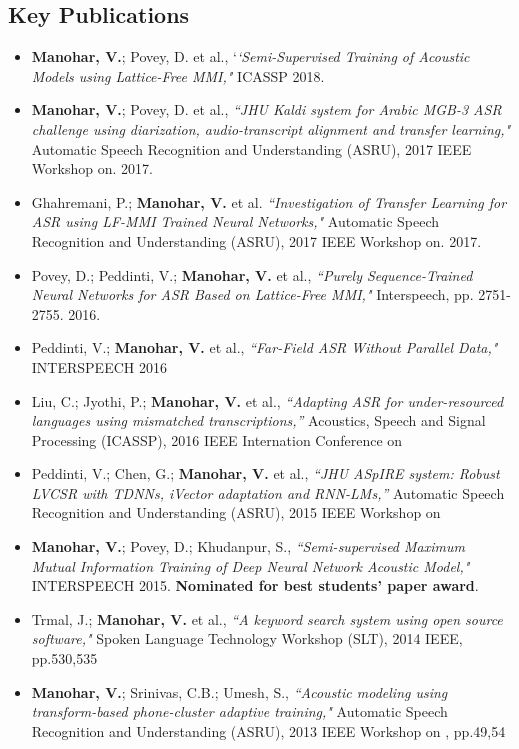 \documentclass[margin,line,pifont,palatino,courier]{res}
\begin{document}
\begin{resume}
\vspace{-2pt}

\section{\sc Key Publications}
\begin{itemize}
  \item 
  \textbf{Manohar, V.}; Povey, D. et al., `\textit{`Semi-Supervised Training of Acoustic Models using Lattice-Free MMI,"} ICASSP 2018.
  \item
    \textbf{Manohar, V.}; Povey, D. et al., \textit{``JHU Kaldi system for Arabic MGB-3 ASR challenge using diarization, audio-transcript alignment and transfer learning,"} Automatic Speech Recognition and Understanding (ASRU), 2017 IEEE Workshop on. 2017.
  \item 
  Ghahremani, P.; \textbf{Manohar, V.} et al. \textit{``Investigation of Transfer Learning for ASR using LF-MMI Trained Neural Networks,"} Automatic Speech Recognition and Understanding (ASRU), 2017 IEEE Workshop on. 2017.
  \item
    Povey, D.; Peddinti, V.; \textbf{Manohar, V.} et al., \textit{``Purely Sequence-Trained Neural Networks for ASR Based on Lattice-Free MMI,"} Interspeech, pp. 2751-2755. 2016.
  \item
    Peddinti, V.; \textbf{Manohar, V.} et al., 
    \textit{``Far-Field ASR Without Parallel Data,"}
    INTERSPEECH 2016
  \item 
    Liu, C.; Jyothi, P.; \textbf{Manohar, V.} et al.,
    \textit{``Adapting ASR for under-resourced languages using mismatched
    transcriptions,''}
    Acoustics, Speech and Signal Processing (ICASSP), 2016 IEEE Internation Conference on 
  \item 
    Peddinti, V.; Chen, G.; \textbf{Manohar, V.} et al.,
    \textit{``JHU ASpIRE system: Robust LVCSR with TDNNs, iVector adaptation and
    RNN-LMs,''}
    Automatic Speech Recognition and Understanding (ASRU), 2015 IEEE Workshop
    on
  \item 
    \textbf{Manohar, V.}; Povey, D.; Khudanpur, S., 
    \textit{``Semi-supervised Maximum Mutual Information Training of Deep Neural
    Network Acoustic Model,"}
    INTERSPEECH 2015. \textbf{Nominated for best students' paper award}.
  \item
    Trmal, J.; \textbf{Manohar, V.} et al., 
    \textit{``A keyword search system using open source software," } 
    Spoken Language Technology Workshop (SLT), 2014 IEEE, pp.530,535
  \item
    \textbf{Manohar, V.}; Srinivas, C.B.; Umesh, S., 
    \textit{``Acoustic modeling
    using transform-based phone-cluster adaptive training,"} 
    Automatic Speech Recognition and Understanding (ASRU), 2013 IEEE Workshop on
    , pp.49,54
\end{itemize}

\end{resume}
\end{document}

